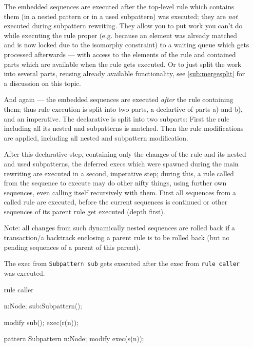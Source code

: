 \begin{note}
The embedded sequences are executed after the top-level rule which contains them (in a nested pattern or in a used subpattern) was executed; they are \emph{not} executed during subpattern rewriting.
They allow you to put work you can't do while executing the rule proper (e.g. because an element was already matched and is now locked due to the isomorphy constraint) to a waiting queue which gets processed afterwards --- with access to the elements of the rule and contained parts which are available when the rule gets executed.
Or to just split the work into several parts, reusing already available functionality, see \ref{sub:mergesplit} for a discussion on this topic.
\end{note}

\begin{note}
And again --- the embedded sequences are executed \emph{after} the rule containing them;
thus rule execution is split into two parts, a declartive of parts a) and b), and an imperative.
The declarative is split into two subparts:
First the rule including all its nested and subpatterns is matched.
Then the rule modifications are applied, including all nested and subpattern modification.

After this declarative step, containing only the changes of the rule and its nested and used subpatterns,
the deferred execs which were spawned during the main rewriting are executed in a second, imperative step;
during this, a rule called from the sequence to execute may do other nifty things, 
using further own sequences, even calling itself recursively with them.
First all sequences from a called rule are executed, before the current sequences is continued or other sequences of its parent rule get executed (depth first).

Note: all changes from such dynamically nested sequences are rolled back if a transaction/a backtrack enclosing a parent rule is to be rolled back (but no pending sequences of a parent of this parent).
\end{note}

\begin{example}
	The exec from \texttt{Subpattern sub} gets executed after the exec from \texttt{rule caller} was executed.
	\begin{grgen}
rule caller
{
  n:Node;
  sub:Subpattern();
    
  modify {
    sub();
    exec(r(n));
  }
}  
pattern Subpattern
{
  n:Node;
  modify {
    exec(s(n));
  }
}
	\end{grgen}
\end{example}

